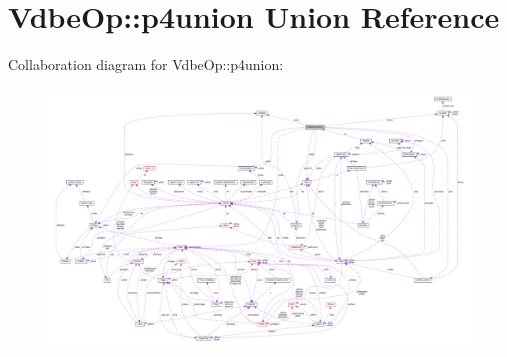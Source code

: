 \hypertarget{unionVdbeOp_1_1p4union}{}\section{Vdbe\+Op\+:\+:p4union Union Reference}
\label{unionVdbeOp_1_1p4union}


Collaboration diagram for Vdbe\+Op\+:\+:p4union\+:\nopagebreak
\begin{figure}[H]
\begin{center}
\leavevmode
\includegraphics[width=350pt]{unionVdbeOp_1_1p4union__coll__graph}
\end{center}
\end{figure}
